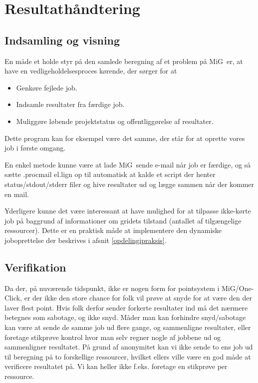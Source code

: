 \documentclass[final,a4paper,11pt]{article}
\newcommand{\mig}{MiG}
\newcommand{\oc}{One-Click}
\begin{document}
\section{Resultathåndtering}\label{resultatindsamling}
\subsection{Indsamling og visning}
En måde et holde styr på den samlede beregning af et problem på \mig\ er, at have en vedligeholdelsesproces kørende, der sørger for at 
\begin{itemize}
	\item Genkøre fejlede job.
	\item Indsamle resultater fra færdige job.
	\item Muliggøre løbende projektstatus og offentliggørelse af resultater. 
\end{itemize}
Dette program kan for eksempel være det samme, der står for at oprette vores job i første omgang. 

En enkel metode kunne være at lade \mig\ sende e-mail når job er færdige, og så sætte .procmail el.lign op til automatisk at kalde et script der henter status/stdout/stderr filer og hive resultater ud og lægge sammen når der
kommer en mail.

Yderligere kunne det være interessant at have mulighed for at tilpasse ikke-kørte job på baggrund af informationer om gridets tilstand (antallet af tilgængelige ressourcer). Dette er en praktisk måde at implementere den dynamiske joboprettelse der beskrives i afsnit \ref{opdelingipraksis}. 

\subsection{Verifikation}
Da der, på nuværende tidspunkt, ikke er nogen form for pointsystem i \mig/\oc,
er der ikke den store chance for folk vil prøve at snyde for at være den der
laver flest point. Hvis folk derfor sender forkerte resultater ind må det
nærmere betegnes som sabotage, og ikke snyd. Måder man kan forhindre
snyd/sabotage kan være at sende de samme job ud flere gange, og sammenligne
resultater, eller foretage stikprøve kontrol hvor man selv regner nogle af
jobbene ud og sammenligner resultatet. 
På grund af anonymitet kan vi ikke sende to ens job ud til beregning på to forskellige ressourcer, hvilket ellers ville være en god måde at verificere resultatet på. Vi kan heller ikke f.eks. foretage en stikprøve per ressource. 
\end{document}
